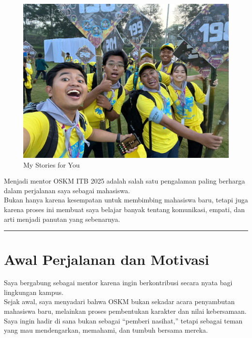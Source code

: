 \documentclass[
  letterpaper,
  DIV=11,
  numbers=noendperiod]{scrreprt}
\begin{document}
\begin{figure}[H]

{\centering \includegraphics[width=9.5\linewidth,height=\textheight,keepaspectratio]{My_Stories_for_You/../images/oke.jpeg}

}

\caption{My Stories for You}

\end{figure}%

Menjadi mentor OSKM ITB 2025 adalah salah satu pengalaman paling
berharga dalam perjalanan saya sebagai mahasiswa.\\
Bukan hanya karena kesempatan untuk membimbing mahasiswa baru, tetapi
juga karena proses ini membuat saya belajar banyak tentang komunikasi,
empati, dan arti menjadi panutan yang sebenarnya.

\begin{center}\rule{0.5\linewidth}{0.5pt}\end{center}

\section{Awal Perjalanan dan
Motivasi}\label{awal-perjalanan-dan-motivasi}

Saya bergabung sebagai mentor karena ingin berkontribusi secara nyata
bagi lingkungan kampus.\\
Sejak awal, saya menyadari bahwa OSKM bukan sekadar acara penyambutan
mahasiswa baru, melainkan proses pembentukan karakter dan nilai
kebersamaan.\\
Saya ingin hadir di sana bukan sebagai ``pemberi nasihat,'' tetapi
sebagai teman yang mau mendengarkan, memahami, dan tumbuh bersama
mereka.
\end{document}
